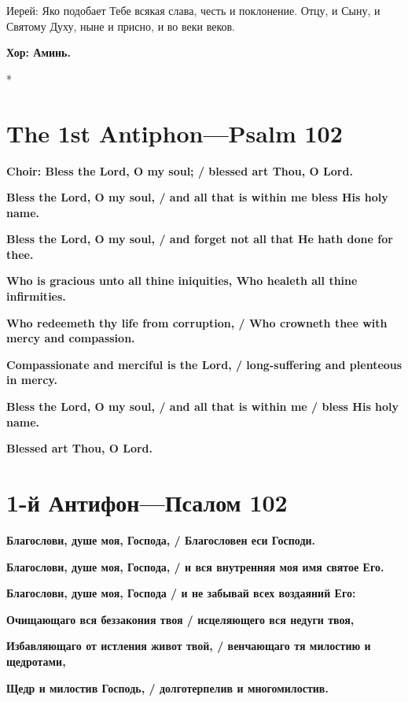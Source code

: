 \documentclass[12pt,a4paper,titlepage]{report}
\begin{document}
\begin{paracol}[1]{2}
	Иерей: Яко подобает Тебе всякая слава, честь и поклонение. Отцу, и Сыну, и Святому Духу, ныне и присно, и во веки веков.
	
	\textbf{Хор: Аминь.}
	
	\switchcolumn[0]*
	
	\section*{The 1st Antiphon---Psalm 102}
	\textbf{Choir: Bless the Lord, O my soul; / blessed art Thou, O Lord.}
	
	\textbf{Bless the Lord, O my soul, / and all that is within me bless His holy name.}
	
	\textbf{Bless the Lord, O my soul, / and forget not all that He hath done for thee.}
	
	\textbf{Who is gracious unto all thine iniquities, Who healeth all thine infirmities.}
	
	\textbf{Who redeemeth thy life from corruption, / Who crowneth thee with mercy and compassion.}
	
	\textbf{Compassionate and merciful is the Lord, / long-suffering and plenteous in mercy.}
	
	\textbf{Bless the Lord, O my soul, / and all that is within me / bless His holy name.}
	
	\textbf{Blessed art Thou, O Lord.}
	
	\switchcolumn[1]
	
	\section*{1-й Антифон---Псалом 102}
	\textbf{Благослови, душе моя, Господа, / Благословен еси Господи.}
	
	\textbf{Благослови, душе моя, Господа, / и вся внутренняя моя имя святое Его.}
	
	\textbf{Благослови, душе моя, Господа / и не забывай всех воздаяний Его:}
	
	\textbf{Очищающаго вся беззакония твоя / исцеляющего вся недуги твоя,}
	
	\textbf{Избавляющаго от истления живот твой, / венчающаго тя милостию и щедротами,}
	
	\textbf{Щедр и милостив Господь, / долготерпелив и многомилостив.}
	

\end{paracol}
\end{document}
